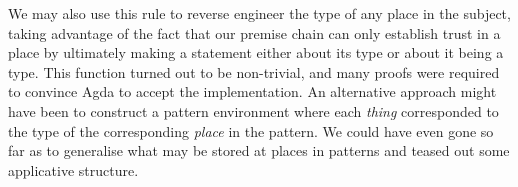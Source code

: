 We may also use this rule to reverse engineer
the type of any place in the subject, taking advantage of the fact that
our premise chain can only establish trust in a place by ultimately making
a statement either about its type or about it being a type. This function
turned out to be non-trivial, and many proofs were required to convince
Agda to accept the implementation. An alternative approach might have been to
construct a pattern environment where each \emph{thing} corresponded to the
type of the corresponding \emph{place} in the pattern. We could have even gone
so far as to generalise what may be stored at places in patterns and
teased out some applicative structure.
\begin{code}%
\>[0]\AgdaSpace{}%
\AgdaSymbol{:}%
\>[1407I]\AgdaSymbol{(}\AgdaSpace{}%
\AgdaSymbol{:}\AgdaSpace{}%
\AgdaSymbol{)}%
\>[39]\<%
\\
\>[.][@{}l@{}]\<[1407I]%
\>[9]\AgdaSymbol{(}\AgdaSpace{}%
\AgdaSymbol{:}\AgdaSpace{}%
\AgdaSpace{}%
\AgdaSymbol{(}\AgdaSpace{}%
\AgdaSpace{}%
\AgdaSpace{}%
\AgdaSymbol{)}\AgdaSpace{}%
\AgdaSymbol{)}%
\>[39]\<%
\\
%
\>[9]\AgdaSymbol{(}\AgdaSpace{}%
\AgdaSpace{}%
\AgdaSpace{}%
\AgdaSymbol{)}\AgdaSpace{}%
%
\>[39]\<%
\\
%
\>[9]\AgdaSymbol{((}\AgdaSpace{}%
\AgdaSpace{}%
\AgdaSymbol{(}\AgdaSpace{}%
\AgdaSymbol{))}%
\>[29]\AgdaSymbol{)}%
\>[39]\<%
\\
%
\>[9]\AgdaSpace{}%
\AgdaSymbol{((}\AgdaSpace{}%
\AgdaSymbol{)}\AgdaSpace{}%
\AgdaOperator{\AgdaPrimitive{+}}\AgdaSpace{}%
\AgdaSymbol{)}\<%
\end{code}
